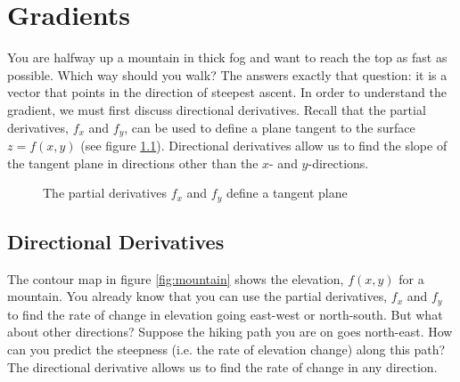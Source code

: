 \chapter{Gradients}

You are halfway up a mountain in thick fog and want to reach the top as fast
as possible. Which way should you walk? The  answers
exactly that question: it is a vector that points in the direction of
steepest ascent. In order to 
understand the gradient, we must first discuss directional derivatives. Recall 
that the partial derivatives, $f_x$ and $f_y$, can be used to define a plane 
tangent to the surface $z = f(x,y)$ (see figure \ref{fig:plane}). Directional 
derivatives allow us to find the slope of the tangent plane in directions 
other than the $x$- and $y$-directions. 

\begin{figure}[H]
    \centering
    \caption{The partial derivatives $f_x$ and $f_y$ define a tangent 
    plane}
    \label{fig:plane}
\end{figure}

\section{Directional Derivatives}
The contour map in figure \ref{fig:mountain} shows the elevation, $f(x, y)$ 
for a mountain. You already know that you can use the partial derivatives, 
$f_x$ and $f_y$ to find the rate of change in elevation going east-west or 
north-south. But what about other directions? Suppose the hiking path you are 
on goes north-east. How can you predict the steepness (i.e. the rate of 
elevation change) along this path? The directional derivative allows us to 
find the rate of change in any direction. 

